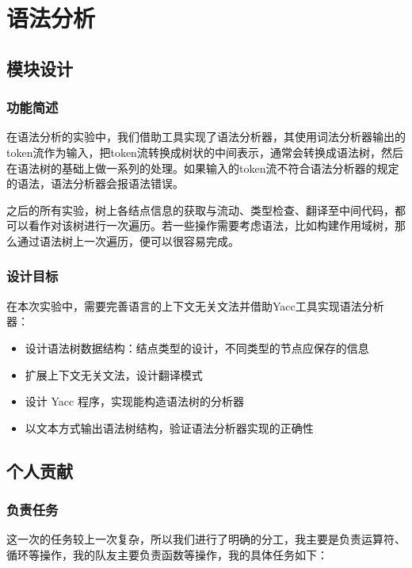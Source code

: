 \documentclass[UTF8,a4paper,10pt]{ctexart}
\begin{document}
\newpage

\section{语法分析}
\subsection{模块设计}
\subsubsection{功能简述}
在语法分析的实验中，我们借助工具实现了语法分析器，其使用词法分析器输出的token流作为输入，把token流转换成树状的中间表示，通常会转换成语法树，然后在语法树的基础上做一系列的处理。如果输入的token流不符合语法分析器的规定的语法，语法分析器会报语法错误。


之后的所有实验，树上各结点信息的获取与流动、类型检查、翻译至中间代码，都可以看作对该树进行一次遍历。若一些操作需要考虑语法，比如构建作用域树，那么通过语法树上一次遍历，便可以很容易完成。

\subsubsection{设计目标}
在本次实验中，需要完善语言的上下文无关文法并借助Yacc工具实现语法分析器：

\begin{itemize}
  \item 设计语法树数据结构：结点类型的设计，不同类型的节点应保存的信息
  \item 扩展上下文无关文法，设计翻译模式
  \item 设计 Yacc 程序，实现能构造语法树的分析器
  \item 以文本方式输出语法树结构，验证语法分析器实现的正确性
\end{itemize}


\subsection{个人贡献}
\subsubsection{负责任务}
这一次的任务较上一次复杂，所以我们进行了明确的分工，我主要是负责运算符、循环等操作，我的队友主要负责函数等操作，我的具体任务如下：
\end{document}
